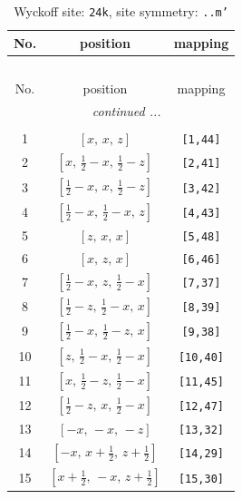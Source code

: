 \documentclass[fleqn,8pt]{jsarticle}
\begin{document}
\begin{longtable}{ccc}
\caption{Wyckoff site: {\tt 24k}, site symmetry: {\tt ..m'}}
 \\
 \hline \hline
No. & position & mapping \\ \hline \endfirsthead

\multicolumn{2}{l}{\tablename\ \thetable{}} \\
 \hline \hline
No. & position & mapping \\ \hline \endhead

 \hline \hline
\multicolumn{2}{r}{\footnotesize\it continued ...} \\ \endfoot

 \hline \hline
\multicolumn{2}{r}{} \\ \endlastfoot

1 & $\left[ x,\, x,\, z \right]$ & {\tt [1,44]} \\ \hline
2 & $\left[ x,\, \frac{1}{2} - x,\, \frac{1}{2} - z \right]$ & {\tt [2,41]} \\ \hline
3 & $\left[ \frac{1}{2} - x,\, x,\, \frac{1}{2} - z \right]$ & {\tt [3,42]} \\ \hline
4 & $\left[ \frac{1}{2} - x,\, \frac{1}{2} - x,\, z \right]$ & {\tt [4,43]} \\ \hline
5 & $\left[ z,\, x,\, x \right]$ & {\tt [5,48]} \\ \hline
6 & $\left[ x,\, z,\, x \right]$ & {\tt [6,46]} \\ \hline
7 & $\left[ \frac{1}{2} - x,\, z,\, \frac{1}{2} - x \right]$ & {\tt [7,37]} \\ \hline
8 & $\left[ \frac{1}{2} - z,\, \frac{1}{2} - x,\, x \right]$ & {\tt [8,39]} \\ \hline
9 & $\left[ \frac{1}{2} - x,\, \frac{1}{2} - z,\, x \right]$ & {\tt [9,38]} \\ \hline
10 & $\left[ z,\, \frac{1}{2} - x,\, \frac{1}{2} - x \right]$ & {\tt [10,40]} \\ \hline
11 & $\left[ x,\, \frac{1}{2} - z,\, \frac{1}{2} - x \right]$ & {\tt [11,45]} \\ \hline
12 & $\left[ \frac{1}{2} - z,\, x,\, \frac{1}{2} - x \right]$ & {\tt [12,47]} \\ \hline
13 & $\left[ - x,\, - x,\, - z \right]$ & {\tt [13,32]} \\ \hline
14 & $\left[ - x,\, x + \frac{1}{2},\, z + \frac{1}{2} \right]$ & {\tt [14,29]} \\ \hline
15 & $\left[ x + \frac{1}{2},\, - x,\, z + \frac{1}{2} \right]$ & {\tt [15,30]} \\ \hline

\end{longtable}
\end{document}
